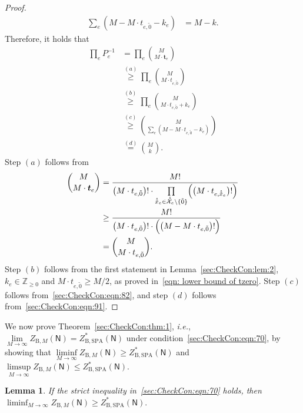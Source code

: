 \documentclass[journal]{IEEEtran}
\newtheorem{lemma}[theorem]{Lemma}
\newcommand{\vect}[1]{ \bm{#1} }
\newcommand{\vt}{ \vect{t} }
\newcommand{\graphN}{ \mathsf{N} }
\newcommand{\sZp}{ \mathbb{Z}_{\geq 0} }
\newcommand{\ZBSPA}{ Z_{\mathrm{B,SPA}} }
\newcommand{\ZBM}{ Z_{\mathrm{B},M} }
\newcommand{\LCTtset}[1]{\mathring{\tilde{\mathcal{#1}}}}
\newcommand{\LCTt}[1]{ \mathring{ \tilde{#1} } }
\newcommand{\tzero}{\tilde{0}}
\newcommand*{\ie}{\textit{i.e.}}
\begin{document}
\begin{appendices}
\begin{proof}
\begin{align}
      \sum_{e}
      ( M - M \cdot t_{e,\tzero} - k_{e} ) & = M-k.
      \label{sec:CheckCon:eqn:91}
    \end{align}
    Therefore, it holds that
    \begin{align*}
      \prod_{e}
      P_{e}^{-1}
       & =
      \prod_{ e }
      \binom{M}{ M \cdot \vt_{e} }
      \nonumber                             \\
       &
      \overset{(a)}{\geq}
      \prod_{ e } \binom{ M }{
                    M \cdot t_{ e, \tzero }
                  }
      \nonumber                             \\
       & \overset{(b)}{\geq}
      \prod_{ e }
      \binom{ M }{
        M \cdot t_{e,\tzero} + k_{e}
      } \nonumber         \\
       & \overset{(c)}{\geq}
      \binom{M}{\sum\limits_{e}
        ( M - M \cdot t_{e,\tzero} - k_{e} )}
      \nonumber                             \\
       & \overset{(d)}{=} \binom{ M }{ k }.
    \end{align*}
    Step $(a)$ follows from
    \begin{align*}
      \binom{M}{ M \cdot \vt_{e} }
       & = \frac{ M! }{
             \bigl( M \cdot t_{ e, \tzero } \bigr)!
             \cdot
             \prod\limits_{ \LCTt{x}_{e} \in \LCTtset{X}_{e} \setminus \{\tzero\} }
             \Bigl(
             \bigl( M \cdot t_{ e, \LCTt{x}_{e} } \bigr)!
             \Bigr)
           }
      \\
       & \geq
      \frac{ M! }{
        \bigl( M \cdot t_{ e, \tzero } \bigr)!
        \cdot
        \Bigl(
        \bigl( M - M \cdot t_{ e, \tzero } \bigr)!
        \Bigr)
      }
      \\
       & =
      \binom{ M }{
        M \cdot t_{ e, \tzero }
      }.
    \end{align*}
    Step $(b)$ follows from the first statement in Lemma~\ref{sec:CheckCon:lem:2},
    $ k_{e} \in \sZp $ and
    $ M \cdot t_{ e, \tzero } \geq M/2 $, as proved in~\eqref{eqn: lower bound of tzero}.
    Step $(c)$ follows from~\eqref{sec:CheckCon:eqn:82}, and step $(d)$ follows from~\eqref{sec:CheckCon:eqn:91}.
  \end{proof}

  We now prove Theorem~\ref{sec:CheckCon:thm:1}, \ie,
  $
    \lim\limits_{M\to\infty}\ZBM(\graphN)
    = \ZBSPA^{*}(\graphN)
  $
  under condition~\eqref{sec:CheckCon:eqn:70}, by showing that
  $
    \liminf\limits_{M\to\infty}\ZBM(\graphN)
    \geq \ZBSPA^{*}(\graphN)$ and
  $
    \limsup\limits_{M\to\infty}\ZBM(\graphN)
    \leq \ZBSPA^{*}(\graphN).
  $
  \begin{lemma}\label{sec:CheckCon:lem:liminf Z N0 greater than ZSPA}
    If the strict inequality in~\eqref{sec:CheckCon:eqn:70} holds, then
    $
      \liminf_{M \to \infty}
      \ZBM(\graphN)
      \geq \ZBSPA^{*}(\graphN).
    $
  \end{lemma}


\end{appendices}
\end{document}
